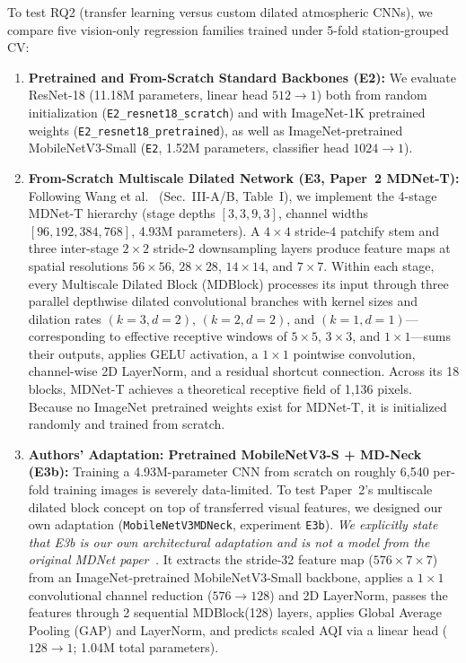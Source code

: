 \documentclass[conference]{IEEEtran}
\begin{document}
To test RQ2 (transfer learning versus custom dilated atmospheric CNNs), we
compare five vision-only regression families trained under 5-fold
station-grouped CV:
\begin{enumerate}
  \item \textbf{Pretrained and From-Scratch Standard Backbones (E2):} We
        evaluate ResNet-18 (11.18M parameters, linear head $512 \to 1$) both
        from random initialization (\texttt{E2\_resnet18\_scratch}) and with
        ImageNet-1K pretrained weights (\texttt{E2\_resnet18\_pretrained}), as
        well as ImageNet-pretrained MobileNetV3-Small (\texttt{E2}, 1.52M
        parameters, classifier head $1024 \to 1$).
  \item \textbf{From-Scratch Multiscale Dilated Network (E3, Paper~2 MDNet-T):}
        Following Wang et al.~\cite{wangLightweightAirQuality2024}
        (Sec.~III-A/B, Table~I), we implement the 4-stage MDNet-T hierarchy
        (stage depths $[3, 3, 9, 3]$, channel widths $[96, 192, 384, 768]$,
        4.93M parameters). A $4 \times 4$ stride-4 patchify stem and three
        inter-stage $2 \times 2$ stride-2 downsampling layers produce feature
        maps at spatial resolutions $56 \times 56$, $28 \times 28$,
        $14 \times 14$, and $7 \times 7$. Within each stage, every Multiscale
        Dilated Block (MDBlock) processes its input through three parallel
        depthwise dilated convolutional branches with kernel sizes and dilation
        rates $(k = 3, d = 2)$, $(k = 2, d = 2)$, and
        $(k = 1, d = 1)$---corresponding to effective receptive windows of
        $5 \times 5$, $3 \times 3$, and $1 \times 1$---sums their outputs,
        applies GELU activation, a $1 \times 1$ pointwise convolution,
        channel-wise 2D LayerNorm, and a residual shortcut connection. Across
        its 18 blocks, MDNet-T achieves a theoretical receptive field of 1,136
        pixels. Because no ImageNet pretrained weights exist for MDNet-T, it is
        initialized randomly and trained from scratch.
  \item \textbf{Authors' Adaptation: Pretrained MobileNetV3-S + MD-Neck (E3b):}
        Training a 4.93M-parameter CNN from scratch on roughly 6,540 per-fold
        training images is severely data-limited. To test Paper~2's multiscale
        dilated block concept on top of transferred visual features, we designed
        our own adaptation (\texttt{MobileNetV3MDNeck}, experiment
        \texttt{E3b}). \textit{We explicitly state that E3b is our own
        architectural adaptation and is not a model from the original MDNet
        paper~\cite{wangLightweightAirQuality2024}.} It extracts the stride-32
        feature map ($576 \times 7 \times 7$) from an ImageNet-pretrained
        MobileNetV3-Small backbone, applies a $1 \times 1$ convolutional channel
        reduction ($576 \to 128$) and 2D LayerNorm, passes the features through
        2 sequential MDBlock(128) layers, applies Global Average Pooling (GAP)
        and LayerNorm, and predicts scaled AQI via a linear head ($128 \to 1$;
        1.04M total parameters).
\end{enumerate}
\end{document}
